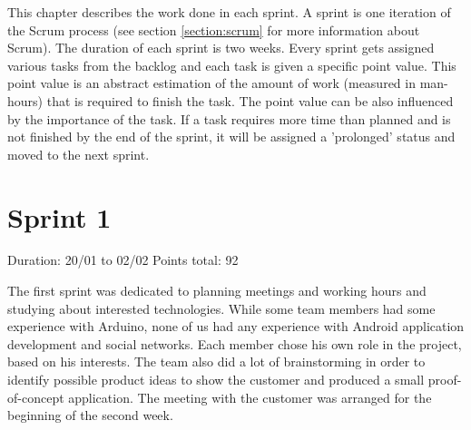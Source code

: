 
This chapter describes the work done in each sprint. A sprint is one iteration of the Scrum process
(see section \ref{section:scrum} for more information about Scrum). The duration of each sprint is two weeks.
Every sprint gets assigned various tasks from the backlog and each task is given a specific point value.
This point value is an abstract estimation of the amount of work (measured in man-hours) that is required to finish the task.
The point value can be also influenced by the importance of the task. If a task requires more time than
planned and is not finished by the end of the sprint, it will be assigned a 'prolonged' status and
moved to the next sprint.

\newpage

\section{Sprint 1}

Duration: 20/01 to 02/02
Points total: 92

The first sprint was dedicated to planning meetings and working hours
and studying about interested technologies. While some team members had some
experience with Arduino, none of us had any experience with Android application
development and social networks. Each member chose his own role in the project,
based on his interests. The team also did a lot of brainstorming in order
to identify possible product ideas to show the customer and produced a small
proof-of-concept application. The meeting with the customer was arranged for
the beginning of the second week.

